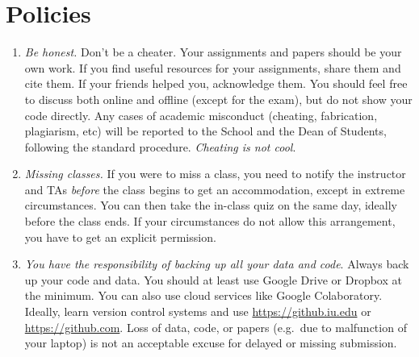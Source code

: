 \documentclass[11pt,article,oneside]{memoir} %
\begin{document}
\section{Policies}%
\begin{enumerate}%
    \setlength\itemsep{1em}


\item \emph{Be honest.} Don't be a cheater. Your assignments and papers should be your own work.  
If you find useful resources for your assignments, share them and cite them. 
If your friends helped you, acknowledge them. 
You should feel free to discuss both online and offline (except for the exam), but do not show your code directly.  
Any cases of academic misconduct (cheating, fabrication, plagiarism, etc) will be reported to the School and the Dean of Students, following the standard procedure. 
\emph{Cheating is not cool}. 

\item \emph{Missing classes.} If you were to miss a class, you need to notify the instructor and TAs \emph{before} the class begins to get an accommodation, except in extreme circumstances. You can then take the in-class quiz on the same day, ideally before the class ends. If your circumstances do not allow this arrangement, you have to get an explicit permission. 

\item \emph{You have the responsibility of backing up all your data and code}.
Always back up your code and data. You should at least use Google Drive or Dropbox at the minimum.
You can also use cloud services like Google Colaboratory.
Ideally, learn version control systems and use \url{https://github.iu.edu} or \url{https://github.com}. 
Loss of data, code, or papers (e.g.~due to malfunction of your laptop) is not an acceptable excuse for delayed or missing submission. 


\end{enumerate}
\end{document}
